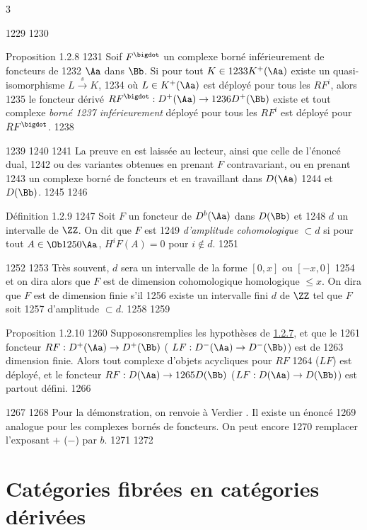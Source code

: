 3	\documentclass[10pt]{../fichiers-configuration-latex/smfart}
\begin{document}
  1229	
  1230	\begin{enonce*}{Proposition 1.2.8}
  1231	Soif $F^{\bigdot}$ un complexe borné inférieurement de foncteurs de
  1232	$\Aa$ dans $\Bb$. Si pour tout $K\in
  1233	K^{+}(\Aa)$ existe un quasi-isomorphisme $L\xrightarrow{s}K$,
  1234	où $L\in K^{+}(\Aa)$ est déployé pour tous les $RF^{i}$, alors
  1235	le foncteur dérivé $RF^{\bigdot}:D^{+}(\Aa)\rightarrow
  1236	D^{+}(\Bb)$ existe et tout complexe \emph{borné
  1237	inférieurement} déployé pour tous les $RF^{i}$ est déployé pour $RF^{\bigdot}$.
  1238	\end{enonce*}
  1239	
  1240	\sisi{\noindent}{}%
  1241	La preuve en est laissée au lecteur, ainsi que celle de l'énoncé dual,
  1242	ou des variantes obtenues en prenant $F$ contravariant, ou en prenant
  1243	un complexe borné de foncteurs et en travaillant dans $D(\Aa)$
  1244	et $D(\Bb)$.
  1245	
  1246	\begin{enonce*}{Définition 1.2.9}
  1247	Soit $F$ un foncteur de $D^{b}(\Aa)$ dans $D(\Bb)$ et
  1248	$d$ un intervalle de $\ZZ$. On dit que $F$ est
  1249	\emph{d'amplitude cohomologique $\subset d$} si pour tout $A\in \Ob
  1250	\Aa$, $H^{i}F(A)=0$ pour $i\not\in d$.
  1251	\end{enonce*}
  1252	
  1253	Très souvent, $d$ sera un intervalle de la forme $[0,x]$ ou $[-x,0]$
  1254	et on dira alors que $F$ est de dimension cohomologique 	homologique $\leq x$. On dira que $F$ est de dimension finie s'il
  1256	existe un intervalle fini $d$ de $\ZZ$ tel que $F$ soit
  1257	d'amplitude $\subset d$.
  1258	
  1259	\begin{enonce*}{Proposition 1.2.10}
  1260	Supposons\pageoriginale remplies les hypothèses de \hyperref[XVII.prop1.2.7]{1.2.7}, et que le
  1261	foncteur $RF:D^{+}(\Aa)\rightarrow D^{+}(\Bb)$ (	$LF:D^{-}(\Aa)\rightarrow D^{-}(\Bb)$) est de
  1263	dimension finie. Alors tout complexe d'objets acycliques pour $RF$
  1264	(\resp $LF$) est déployé, et le foncteur $RF:D(\Aa)\rightarrow
  1265	D(\Bb)$ (\resp $LF:D(\Aa)\rightarrow D(\Bb)$) est partout défini.
  1266	\end{enonce*}
  1267	
  1268	Pour la démonstration, on renvoie à Verdier \cite{CD}. Il existe un énoncé
  1269	analogue pour les complexes bornés de foncteurs. On peut encore
  1270	remplacer l'exposant $+$ (\resp $-$) par $b$.
  1271	
  1272	\section{Catégories fibrées en catégories dérivées}
\end{document}
